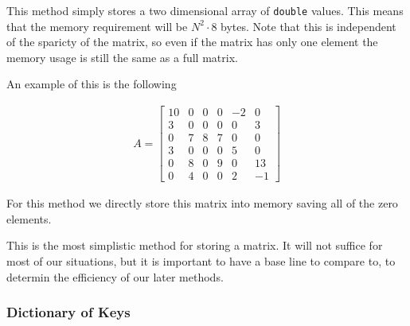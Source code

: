 \documentclass[../fem.tex]{subfiles}
\begin{document}
This method simply stores a two dimensional array of \texttt{double}
values. This means that the memory requirement will be $N^2\cdot 8$ bytes. Note
that this is independent of the sparicty of the matrix, so even if the matrix
has only one element the memory usage is still the same as a full matrix.

An example of this is the following

\begin{align*}
  A = \begin{bmatrix}
    10 & 0 & 0 & 0 & -2 & 0 \\
    3 & 0 & 0 & 0 & 0 & 3 \\
    0 & 7 & 8 & 7 & 0 & 0 \\
    3 & 0 & 0 & 0 & 5 & 0 \\
    0 & 8 & 0 & 9 & 0 & 13 \\
    0 & 4 & 0 & 0 & 2 & -1
  \end{bmatrix}
\end{align*}

For this method we directly store this matrix into memory saving all of the
zero elements.

This is the most simplistic method for storing a matrix. It will not suffice
for most of our situations, but it is important to have a base line to compare
to, to determin the efficiency of our later methods.

\begin{Figure}
  \begin{center}
  \end{center}
  \label{fig:mat_full}
\end{Figure}

\subsubsection{Dictionary of Keys}%
\label{ssub:dictionary_of_keys}
\end{document}
